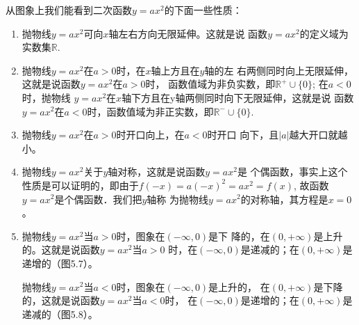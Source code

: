 从图象上我们能看到二次函数$y=ax^2$的下面一些性质：
\begin{enumerate}
    \item 抛物线$y=ax^2$可向$x$轴左右方向无限延伸。这就是说
函数$y=ax^2$的定义域为实数集$\mathbb{R}$.
\item 抛物线$y=ax^2$在$a>0$时，在$x$轴上方且在$y$轴的左
右两侧同时向上无限延伸，这就是说函数$y=ax^2$在$a>0$时，
函数值域为非负实数，即$\mathbb{R}^{+}\cup \{0\}$; 在$a<0$时，抛物线
$y=ax^2$在$x$轴下方且在y轴两侧同时向下无限延伸，这就是说
函数$y=ax^2$在$a<0$时，函数值域为非正实数，即$\mathbb{R}^{-}\cup \{0\}$.
\item 抛物线$y=ax^2$在$a>0$时开口向上，在$a<0$时开口
向下，且$|a|$越大开口就越小。
\item 抛物线$y=ax^2$关于$y$轴对称，这就是说函数$y=ax^2$是
个偶函数，事实上这个性质是可以证明的，即由于$f(-x)=
a(-x)^2=ax^2=f(x)$, 故函数$y=ax^2$是个偶函数．我们把$y$轴称
为抛物线$y=ax^2$的对称轴，其方程是$x=0$。
\item 抛物线$y=ax^2$当$a>0$时，图象在$(-\infty,0)$是下
降的，在$(0,+\infty)$是上升的。这就是说函数$y=ax^2$当$a>0$
时，在$(-\infty,0)$是递减的；在$(0,+\infty)$是递增的（图5.7）。

抛物线$y=ax^2$当$a<0$时，图象在$(-\infty,0)$是上升的，
在$(0,+\infty)$是下降的，这就是说函数$y=ax^2$当$a<0$时，
在$(-\infty,0)$是递增的；在$(0,+\infty)$是递减的（图5.8）。
\end{enumerate}

\begin{figure}[htp]\centering
    \begin{minipage}[t]{0.48\textwidth}
    \centering
{}
    \caption{}
    \end{minipage}
    \begin{minipage}[t]{0.48\textwidth}
    \centering
    \caption{}
    \end{minipage}
    \end{figure}

